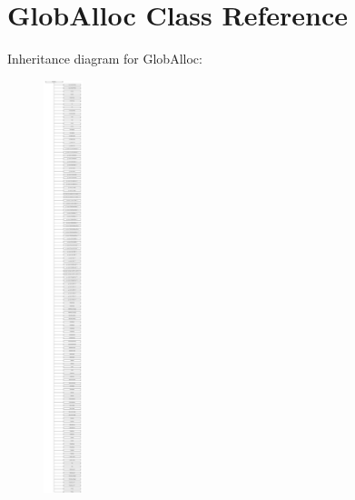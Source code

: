\hypertarget{classGlobAlloc}{\section{Glob\-Alloc Class Reference}
\label{classGlobAlloc}
}
Inheritance diagram for Glob\-Alloc\-:\begin{figure}[H]
\begin{center}
\leavevmode
\includegraphics[height=12.000000cm]{classGlobAlloc}
\end{center}
\end{figure}
